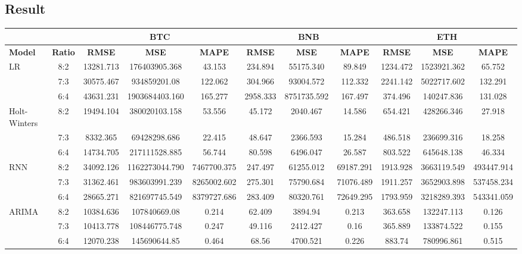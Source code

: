 \documentclass[conference]{IEEEtran}
\begin{document}
\subsection{Result} 
\begin{table}[H]
\centering
\small
\setlength{\tabcolsep}{0.5pt} 
\begin{tabular}{|l|c||c||c||c||c||c||c||c||c||c|}
\hline
& & \multicolumn{3}{c|}{\textbf{BTC}} & \multicolumn{3}{c|}{\textbf{BNB}} & \multicolumn{3}{c|}{\textbf{ETH}} \\
\hline
\textbf{Model} & \textbf{Ratio} & \textbf{RMSE} & \textbf{MSE} & \textbf{MAPE} & \textbf{RMSE} & \textbf{MSE} & \textbf{MAPE} & \textbf{RMSE} & \textbf{MSE} & \textbf{MAPE} \\
\hline
LR   & 8:2 & 13281.713 & 176403905.368 & 43.153 & 234.894 & 55175.340 & 89.849 & 1234.472 &  1523921.362 & 65.752\\
    & 7:3 & 30575.467 & 934859201.08 & 122.062 & 304.966 & 93004.572 & 112.332 & 2241.142  & 5022717.602 & 132.291 \\
    & 6:4 & 43631.231 & 1903684403.160 & 165.277 & 2958.333 & 8751735.592 & 167.497 & 374.496 & 140247.836 & 131.028  \\
\hline
Holt-Winters & 8:2 & 19494.104 & 380020103.158 & 53.556 & 45.172 & 2040.467 & 14.586 & 654.421 & 428266.346 & 27.918 \\
    & 7:3 & 8332.365 & 69428298.686 & 22.415 & 48.647 & 2366.593 & 15.284 & 486.518 & 236699.316 & 18.258  \\
    & 6:4 & 14734.705 & 217111528.885 & 56.744 & 80.598 & 6496.047 & 26.587 & 803.522 & 645648.138 & 46.334 \\
\hline
RNN & 8:2 & 34092.126 & 1162273044.790 & 7467700.375 & 247.497 & 61255.012 & 69187.291 & 1913.928 & 3663119.549 & 493447.914 \\
    & 7:3 & 31362.461 & 983603991.239 & 8265002.602 & 275.301 & 75790.684 & 71076.489 & 1911.257 & 3652903.898 & 537458.234 \\
    & 6:4 & 28665.271 & 821697745.549 & 8379727.686 & 283.409 & 80320.761 & 72649.295 & 1793.959 & 3218289.393 & 543341.059 \\
\hline
ARIMA & 8:2 & 10384.636 & 107840669.08 & 0.214 & 62.409 & 3894.94 & 0.213 & 363.658 & 132247.113 & 0.126 \\
    & 7:3 & 10413.778 & 108446775.748 & 0.247 & 49.116 & 2412.427 & 0.16 & 365.889 & 133874.522 & 0.155 \\
    & 6:4 & 12070.238 & 145690644.85 & 0.464 & 68.56 & 4700.521 & 0.226 & 883.74 & 780996.861 & 0.515 \\

\end{tabular}
\end{table}
\end{document}
